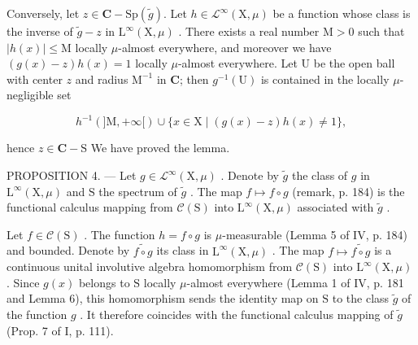 Conversely, let \(z \in \mathbf{C} - \mathrm{Sp}(\widetilde{g})\). Let \(h \in \mathcal{L}^{\infty}(\mathrm{X},\mu)\) be a function whose class is the inverse of \(\widetilde{g} - z\) in \(\mathrm{L}^{\infty}(\mathrm{X},\mu)\) . There exists a real number \(\mathrm{M} > 0\) such that \(|h(x)| \leqslant \mathrm{M}\) locally \(\mu\)-almost everywhere, and moreover we have \((g(x) - z)h(x) = 1\) locally \(\mu\)-almost everywhere. Let U be the open ball with center \(z\) and radius \(\mathrm{M}^{-1}\) in \(\mathbf{C}\); then \(g^{-1}(\mathrm{U})\) is contained in the locally \(\mu\)-negligible set

\[
h ^ { - 1 } ( ] \mathrm{M} , + \infty [ ) \cup \{ x \in \mathrm{X} \mid ( g ( x ) - z ) h ( x ) \neq 1 \} ,
\]

hence \(z \in \mathbf{C} - \mathrm{S}\) We have proved the lemma.

PROPOSITION 4. --- Let \(g \in \mathcal{L}^{\infty}(\mathrm{X},\mu)\) . Denote by \(\widetilde{g}\) the class of \(g\) in \(\mathrm{L}^{\infty}(\mathrm{X},\mu)\) and \(\mathrm{S}\) the spectrum of \(\widetilde{g}\) . The map \(f \mapsto f \circ g\) (remark, p. 184) is the functional calculus mapping from \(\mathcal{C}(\mathrm{S})\) into \(\mathrm{L}^{\infty}(\mathrm{X},\mu)\) associated with \(\widetilde{g}\) .

Let \(f \in \mathcal{C}(\mathrm{S})\) . The function \(h = f \circ g\) is \(\mu\)-measurable (Lemma 5 of IV, p. 184) and bounded. Denote by \(\widetilde{f \circ g}\) its class in \(\mathrm{L}^{\infty}(\mathrm{X},\mu)\) . The map \(f \mapsto \widetilde{f \circ g}\) is a continuous unital involutive algebra homomorphism from \(\mathcal{C}(\mathrm{S})\) into \(\mathrm{L}^{\infty}(\mathrm{X},\mu)\) . Since \(g(x)\) belongs to \(\mathrm{S}\) locally \(\mu\)-almost everywhere (Lemma 1 of IV, p. 181 and Lemma 6), this homomorphism sends the identity map on \(\mathrm{S}\) to the class \(\widetilde{g}\) of the function \(g\) . It therefore coincides with the functional calculus mapping of \(\widetilde{g}\) (Prop. 7 of I, p. 111).